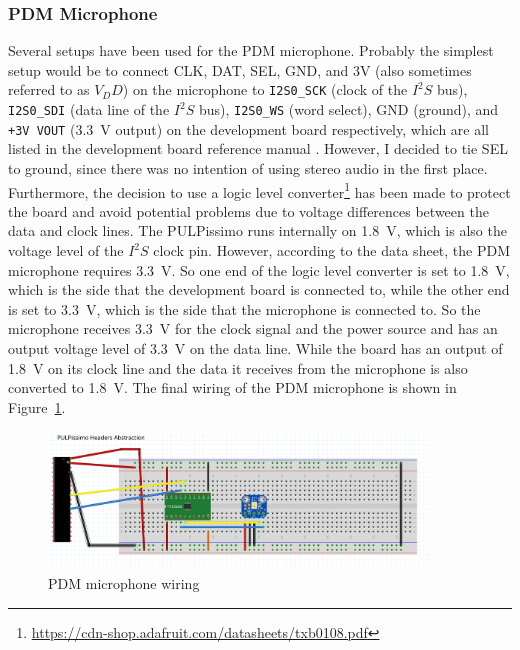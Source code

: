 \subsubsection{PDM Microphone}

Several setups have been used for the PDM microphone.
Probably the simplest setup would be to connect CLK, DAT, SEL, GND, and 3V (also sometimes referred to as $V_DD$) on the microphone
to \lstinline{I2S0_SCK} (clock of the $I^2S$ bus), \lstinline{I2S0_SDI} (data line of the $I^2S$ bus), \lstinline{I2S0_WS} (word select), GND (ground),
and \lstinline{+3V VOUT} (\SI{3.3}{\volt} output) on the development board respectively,
which are all listed in the development board reference manual \cite{pulpissimo}.
However, I decided to tie SEL to ground, since there was no intention of using stereo audio in the first place.\\
Furthermore, the decision to use a logic level converter\footnote{\url{https://cdn-shop.adafruit.com/datasheets/txb0108.pdf}}
has been made to protect the board and avoid potential problems due to voltage differences between the data and clock lines.
The PULPissimo runs internally on \SI{1.8}{\volt}, which is also the voltage level of the $I^2S$ clock pin.
However, according to the data sheet, the PDM microphone requires \SI{3.3}{\volt}.
So one end of the logic level converter is set to \SI{1.8}{\volt}, which is the side that the development board
is connected to, while the other end is set to \SI{3.3}{\volt}, which is the side that the microphone is connected to.
So the microphone receives \SI{3.3}{\volt} for the clock signal and the power source and has an output voltage level
of \SI{3.3}{\volt} on the data line.
While the board has an output of \SI{1.8}{\volt} on its clock line and the data it receives from the microphone is also
converted to \SI{1.8}{\volt}.
The final wiring of the PDM microphone is shown in Figure~\ref{fig:pdm_wiring}.

\begin{figure}[H]
    \centering
    \includegraphics[width=0.9\textwidth]{figures/pdm/wiring.png}
    \caption[PDM microphone wiring with an abstraction for the PULPissimo]{PDM microphone wiring}
    \label{fig:pdm_wiring}
\end{figure}

